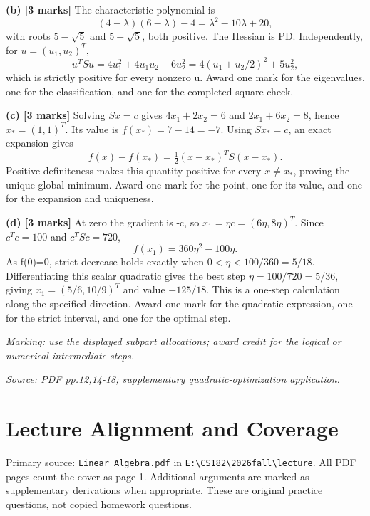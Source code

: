 \documentclass[11pt,a4paper]{article}
\begin{document}
\textbf{(b) [3 marks]} The characteristic polynomial is \[(4-\lambda)(6-\lambda)-4=\lambda^2-10\lambda+20,\] with roots \(5-\sqrt5\) and \(5+\sqrt5\), both positive. The Hessian is PD. Independently, for \(u=(u_1,u_2)^T\), \[u^TSu=4u_1^2+4u_1u_2+6u_2^2=4(u_1+u_2/2)^2+5u_2^2,\] which is strictly positive for every nonzero u. Award one mark for the eigenvalues, one for the classification, and one for the completed-square check.

\textbf{(c) [3 marks]} Solving \(Sx=c\) gives \(4x_1+2x_2=6\) and \(2x_1+6x_2=8\), hence \(x_*=(1,1)^T\). Its value is \(f(x_*)=7-14=-7\). Using \(Sx_*=c\), an exact expansion gives \[f(x)-f(x_*)=\tfrac12(x-x_*)^TS(x-x_*).\] Positive definiteness makes this quantity positive for every \(x\ne x_*\), proving the unique global minimum. Award one mark for the point, one for its value, and one for the expansion and uniqueness.

\textbf{(d) [3 marks]} At zero the gradient is -c, so \(x_1=\eta c=(6\eta,8\eta)^T\). Since \(c^Tc=100\) and \(c^TSc=720\), \[f(x_1)=360\eta^2-100\eta.\] As f(0)=0, strict decrease holds exactly when \(0<\eta<100/360=5/18\). Differentiating this scalar quadratic gives the best step \(\eta=100/720=5/36\), giving \(x_1=(5/6,10/9)^T\) and value \(-125/18\). This is a one-step calculation along the specified direction. Award one mark for the quadratic expression, one for the strict interval, and one for the optimal step.

\textit{Marking: use the displayed subpart allocations; award credit for the logical or numerical intermediate steps.}\par
{\footnotesize\textit{Source: PDF pp.12,14-18; supplementary quadratic-optimization application.}}
\newpage\section*{Lecture Alignment and Coverage}
Primary source: \texttt{Linear\_Algebra.pdf} in \texttt{E:\textbackslash CS182\textbackslash 2026fall\textbackslash lecture}. All PDF pages count the cover as page 1. Additional arguments are marked as supplementary derivations when appropriate. These are original practice questions, not copied homework questions.
\end{document}
